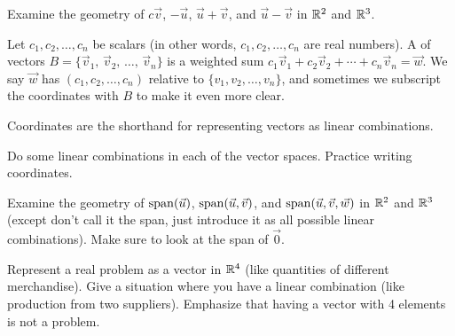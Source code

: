 \begin{problemtodo}
  Examine the geometry of $c\vec v$, $-\vec u$, $\vec u + \vec v$, and $\vec
  u-\vec v$ in $\mathbb{R}^2$ and $\mathbb{R}^3$.
\end{problemtodo}


\begin{definition}
  Let $c_1,c_2,\ldots,c_n$ be scalars (in other words,
  $c_1,c_2,\ldots,c_n$ are real numbers).  A  of vectors $B=\{\vec v_1,\, \vec v_2,\, \ldots,\,
  \vec v_n\}$ is a weighted sum $c_1\vec v_1+c_2\vec
  v_2+\cdots+c_n\vec v_n=\vec w$.  We say $\vec w$ has
   $(c_1,c_2,\ldots,c_n)$ relative to
  $\{v_1,v_2,\ldots,v_n\}$, and sometimes we subscript the coordinates
  with $B$ to make it even more clear.
\end{definition}

Coordinates are the shorthand for representing vectors as linear
combinations.

\begin{problemtodo}
  Do some linear combinations in each of the vector spaces.  Practice
  writing coordinates.
\end{problemtodo}

\begin{problemtodo}\label{prob:geometric spans in Rn}
  Examine the geometry of $\operatorname{span}(\vec u)$, $\operatorname{span}(\vec u, \vec v)$,
  and $\operatorname{span}(\vec u, \vec v, \vec w)$ in $\mathbb{R}^2$ and
  $\mathbb{R}^3$ (except don't call it the span, just introduce it as all
  possible linear combinations).  Make sure to look at the span of
  $\vec 0$.
\end{problemtodo}

\begin{problemtodo}
  Represent a real problem as a vector in $\mathbb{R}^4$ (like quantities of
  different merchandise).  Give a situation where you have a linear
  combination (like production from two suppliers).  Emphasize that
  having a vector with 4 elements is not a problem.
\end{problemtodo}

